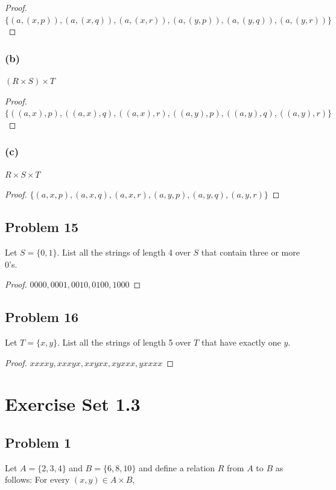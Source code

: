 \documentclass[14pt]{extarticle}
\begin{document}
\begin{proof}
$\{(a, (x, p)), (a, (x, q)), (a, (x, r)), (a, (y, p)),
(a, (y, q)), (a, (y, r))\}$
\end{proof}

\subsubsection{(b)}
$(R \times S) \times T$

\begin{proof}
$\{((a, x), p), ((a, x), q), ((a, x), r), ((a, y), p),
((a, y), q), ((a, y), r)\}$
\end{proof}

\subsubsection{(c)}
$R \times S \times T$

\begin{proof}
$\{(a, x, p), (a, x, q), (a, x, r), (a, y, p), (a, y, q), (a, y, r)\}$
\end{proof}

\subsection{Problem 15}
Let $S = \{0, 1\}$. List all the strings of length 4 over $S$ that contain three
or more 0’s.

\begin{proof}
$0000, 0001, 0010, 0100, 1000$
\end{proof}

\subsection{Problem 16}
Let $T = \{x, y\}$. List all the strings of length 5 over $T$ that have exactly
one $y$.

\begin{proof}
$xxxxy, xxxyx, xxyxx, xyxxx, yxxxx$
\end{proof}

\section{Exercise Set 1.3}

\subsection{Problem 1}
Let $A = \{2, 3, 4\}$ and $B = \{6, 8, 10\}$ and define a relation $R$ from
$A$ to $B$ as follows: For every $(x, y) \in A \times B$,
\end{document}
